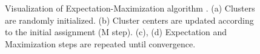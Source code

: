\begin{figure}[t!]
\centering
{}\quad
{}\quad
{}\quad
{}\quad
\caption{
Visualization of Expectation-Maximization algorithm \cite{bishopPatternRecognitionMachine2006}.
(a) Clusters are randomly initialized. 
(b) Cluster centers are updated according to the initial assignment (M step).
(c), (d) Expectation and Maximization steps are repeated until convergence.
}
\label{fig:em}
\end{figure}    